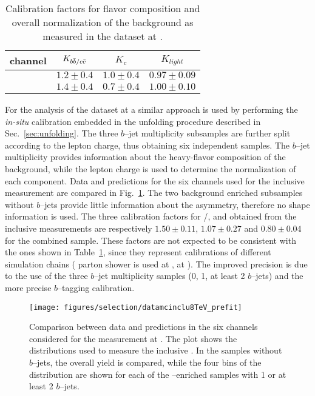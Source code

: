 \begin{table}
  \centering
  \begin{tabular}{lccc}
    \toprule
    channel   & $K_{b\bar{b}{}/c\bar{c}{}}$   & $K_{c}$       &
    $K_{light}$ \\
    \midrule
    \mujets{}  & $1.2\pm0.4$            & $1.0\pm0.4$ &
    $0.97\pm0.09$\\ 
    \ejets{}    & $1.4\pm0.4$            & $0.7\pm0.4$ &
    $1.00\pm0.10$\\ 
    \bottomrule
  \end{tabular}
  \caption{Calibration factors for flavor composition and overall
    normalization of the \wjets{} background as measured in the
    dataset at \seventev{}.}
  \label{tab:wsf}
\end{table}

For the analysis of the dataset at \eighttev{} a similar approach is used by
performing the {\it in-situ} calibration embedded in the unfolding
procedure described  in Sec.~\ref{sec:unfolding}. The three $b$--jet
multiplicity subsamples are further split according to the lepton charge, thus
obtaining six independent samples. The $b$--jet multiplicity provides
information about the heavy-flavor composition of the \wjets{}
background, while the lepton charge is used to determine the
normalization of each component. Data and predictions for the six
channels used for the inclusive \ac{} measurement are compared in
Fig.~\ref{fig:datamc_prefit}. The two background enriched subsamples
without $b$--jets provide little information about the \ttbar{}
asymmetry, therefore no shape information is used.
The three calibration factors for \wbb{}/\wcc{}, \wc{} and \wlight{}
obtained from the inclusive \ac{} measurements are respectively
$1.50\pm0.11$, $1.07\pm0.27$ and $0.80\pm0.04$ for the combined
\ljets{} sample. These factors are not expected to be consistent with
the ones shown in Table~\ref{tab:wsf}, since they represent
calibrations of different simulation chains (\herwig{} parton shower
is used at \seventev{}, \pythia{} at \eighttev{}). The improved
precision is due to the use of the three $b$--jet multiplicity samples
(0, 1, at least 2 $b$--jets) and the more precise $b$--tagging calibration.

\begin{figure}\centering
  \texttt{[image: figures/selection/datamcinclu8TeV\_prefit]}
  \caption{
   Comparison between data and predictions in the six channels
   considered for the measurement at \eighttev{}. The plot shows the
   distributions used to measure the inclusive \ac{}. In the samples
   without $b$--jets, the overall yield is compared, while the four bins
   of the \dy{} distribution are shown for each of the
   \ttbar{}--enriched samples with 1 or at least 2 $b$--jets.
  }
  \label{fig:datamc_prefit}
\end{figure}

